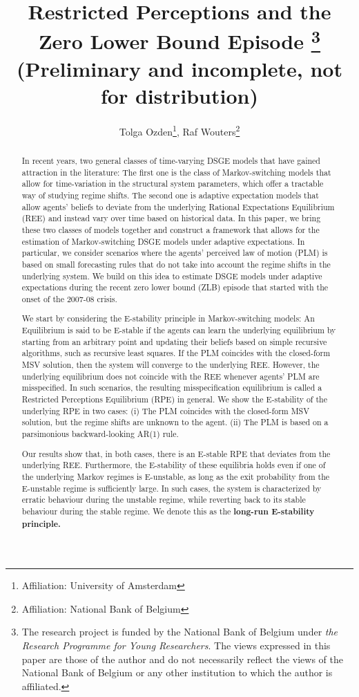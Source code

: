 \documentclass[12pt,reqno]{article}
\title{Restricted Perceptions and the Zero Lower Bound Episode \footnote{The research project is funded by the National Bank of Belgium under \textit{the Research Programme for Young Researchers}. The views expressed in this paper are those of the author and do not necessarily reflect the views 
of the National Bank of Belgium or any other institution to which the author is affiliated.}\vspace{10 mm} \\ (Preliminary and incomplete, not for distribution) }
\author{Tolga Ozden\footnote{Affiliation: University of Amsterdam}, Raf Wouters\footnote{Affiliation: National Bank of Belgium}}
\numberwithin{equation}{section}
\begin{document}
\maketitle

\begin{abstract}

In recent years, two general classes of time-varying DSGE models that have gained attraction in the literature: The first one 
is the class of Markov-switching models that allow for time-variation in the structural system parameters, which offer a tractable way of studying 
regime shifts. The second one is adaptive expectation models that allow agents' beliefs to deviate from the underlying Rational Expectations
Equilibrium (REE) and instead vary over time based on historical data. In this paper, we bring these two classes of models together and construct a framework that allows for the estimation of Markov-switching DSGE models under adaptive expectations.
In particular, we consider scenarios where the agents' perceived law of motion (PLM) is based on small forecasting rules that do not take
into account the regime shifts in the underlying system. We build on this idea to estimate DSGE models under adaptive expectations during 
the recent zero lower bound (ZLB) episode that started with the onset of the 2007-08 crisis.

We start by considering the E-stability principle in Markov-switching models: An Equilibrium is said to be E-stable 
if the agents can learn the underlying equilibrium by starting from an arbitrary point and updating their beliefs based on simple 
recursive algorithms, such as recursive least squares. If the PLM coincides with the closed-form MSV solution, then the system will 
converge to the underlying REE. However, the underlying equilibrium does not coincide with the REE whenever agents' PLM are misspecified.
In such scenarios, the resulting misspecification equilibrium is called a Restricted Perceptions Equilibrium (RPE) in general. We show the E-stability
of the underlying RPE in two cases:
(i) The PLM coincides with the closed-form MSV solution, but the regime shifts are unknown to the agent. 
(ii) The PLM is based on a parsimonious backward-looking AR(1) rule.

Our results show that, in both cases, there is an E-stable RPE that deviates from the underlying REE. Furthermore, the E-stability of 
these equilibria holds even if one of the underlying Markov regimes is E-unstable, as long as the exit probability from the E-unstable
regime is sufficiently large. In such cases, the system is characterized by erratic behaviour during the unstable regime, while reverting
back to its stable behaviour during the stable regime. We denote this as the \textbf{long-run E-stability principle.} \\


\end{abstract}
\end{document}
